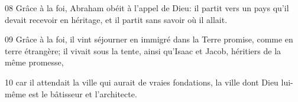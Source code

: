 
08 Grâce à la foi, Abraham obéit à l’appel de Dieu: il partit vers un pays qu’il devait recevoir en héritage, et il partit sans savoir où il allait.

09 Grâce à la foi, il vint séjourner en immigré dans la Terre promise, comme en terre étrangère; il vivait sous la tente, ainsi qu’Isaac et Jacob, héritiers de la même promesse,

10 car il attendait la ville qui aurait de vraies fondations, la ville dont Dieu lui-même est le bâtisseur et l’architecte.